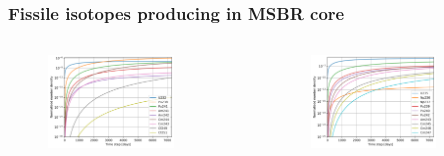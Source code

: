 \documentclass[9pt,handout]{beamer}
\begin{document}
\begin{frame}
  \frametitle{Fissile isotopes producing in \gls{MSBR} core}
  \begin{columns}
    \column[t]{6cm}
               \begin{figure}[t]
                \vspace*{-0.1in}
                \includegraphics[height=0.75\textwidth]{./images/fissile_short.png}
               \end{figure}
    \column[t]{6cm}
               \begin{figure}[t]
                \vspace*{-0.1in}
                \includegraphics[height=0.75\textwidth]{./images/fissile_long.png}
               \end{figure}
    \end{columns}              
\end{frame}
\end{document}
